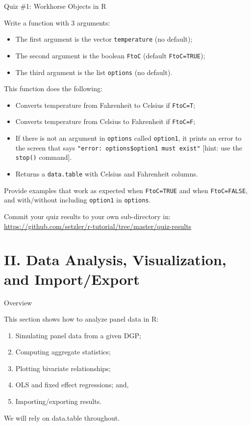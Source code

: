 \documentclass[10pt,ignorenonframetext,]{beamer}
\providecommand{\tightlist}{%
\setlength{\itemsep}{0pt}\setlength{\parskip}{0pt}}
\begin{document}
\begin{frame}[fragile]{Quiz \#1: Workhorse Objects in R}

Write a function with 3 arguments:

\begin{itemize}
\tightlist
\item
  The first argument is the vector \texttt{temperature} (no default);
\item
  The second argument is the boolean \texttt{FtoC} (default
  \texttt{FtoC=TRUE});
\item
  The third argument is the list \texttt{options} (no default).
\end{itemize}

This function does the following:

\begin{itemize}
\tightlist
\item
  Converts temperature from Fahrenheit to Celsius if \texttt{FtoC=T};
\item
  Converts temperature from Celsius to Fahrenheit if \texttt{FtoC=F};
\item
  If there is not an argument in \texttt{options} called
  \texttt{option1}, it prints an error to the screen that says
  \texttt{"error:\ options\$option1\ must\ exist"} {[}hint: use the
  \texttt{stop()} command{]}.
\item
  Returns a \texttt{data.table} with Celsius and Fahrenheit columns.
\end{itemize}

Provide examples that work as expected when \texttt{FtoC=TRUE} and when
\texttt{FtoC=FALSE}, and with/without including \texttt{option1} in
\texttt{options}.

Commit your quiz results to your own sub-directory in:
\url{https://github.com/setzler/r-tutorial/tree/master/quiz-results}

\end{frame}

\section{II. Data Analysis, Visualization, and
Import/Export}\label{ii.-data-analysis-visualization-and-importexport}

\begin{frame}{Overview}

This section shows how to analyze panel data in R:

\begin{enumerate}
\def\labelenumi{\arabic{enumi}.}
\tightlist
\item
  Simulating panel data from a given DGP;
\item
  Computing aggregate statistics;
\item
  Plotting bivariate relationships;
\item
  OLS and fixed effect regressions; and,
\item
  Importing/exporting results.
\end{enumerate}

We will rely on data.table throughout.

\end{frame}
\end{document}
